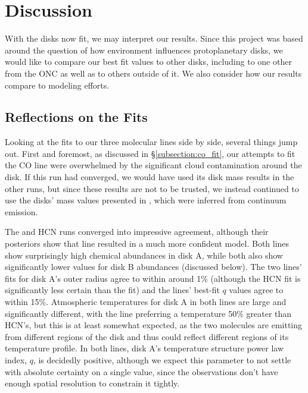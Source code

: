 \chapter{Discussion}
\label{chap:discussion}

With the disks now fit, we may interpret our results. Since this project was based around the question of how environment influences protoplanetary disks, we would like to compare our best fit values to other disks, including to one other from the ONC \citep{Factor2017} as well as to others outside of it. We also consider how our results compare to modeling efforts.


\section{Reflections on the Fits}

Looking at the fits to our three molecular lines side by side, several things jump out. First and foremost, as discussed in \S\ref{subsection:co_fit}, our attempts to fit the CO line were overwhelmed by the significant cloud contamination around the disk. If this run had converged, we would have used its disk mass results in the other runs, but since these results are not to be trusted, we instead continued to use the disks' mass values presented in \citet{Williams2014}, which were inferred from continuum emission.


The \hco and HCN runs converged into impressive agreement, although their posteriors show that \hco line resulted in a much more confident model. Both lines show surprisingly high chemical abundances in disk A, while both also show significantly lower values for disk B abundances (discussed below). The two lines' fits for disk A's outer radius agree to within around 1\% (although the HCN fit is significantly less certain than the \hco fit) and the lines' best-fit $q$ values agree to within 15\%. Atmospheric temperatures for disk A in both lines are large and significantly different, with the \hco line preferring a temperature 50\% greater than HCN's, but this is at least somewhat expected, as the two molecules are emitting from different regions of the disk and thus could reflect different regions of its temperature profile. In both lines, disk A's temperature structure power law index, $q$, is decidedly positive, although we expect this parameter to not settle with absolute certainty on a single value, since the observations don't have enough spatial resolution to constrain it tightly.


